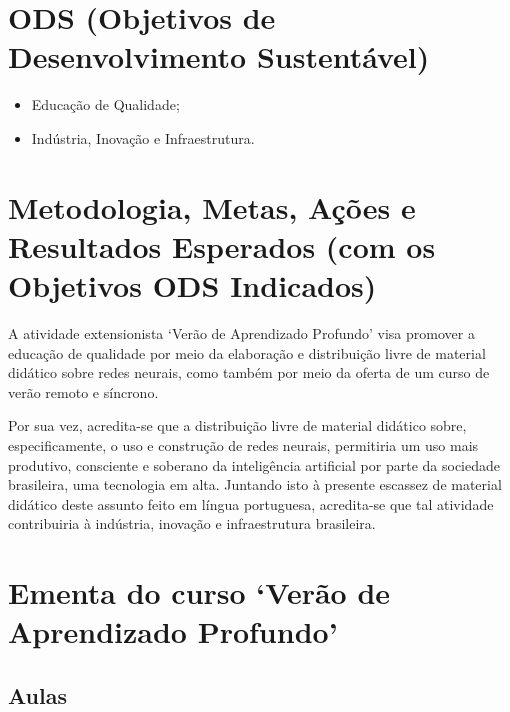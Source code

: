 \documentclass[a4paper,12pt, brazil]{article}
\begin{document}
    \section*{ODS (Objetivos de Desenvolvimento Sustentável)}
    \begin{itemize}
        \item Educação de Qualidade;
        \item Indústria, Inovação e Infraestrutura.
    \end{itemize}

    \section*{Metodologia, Metas, Ações e Resultados Esperados (com os Objetivos ODS Indicados)}
    A atividade extensionista `Verão de Aprendizado Profundo' visa promover a educação de qualidade por meio da elaboração e distribuição livre de material didático sobre redes neurais, como também por meio da oferta de um curso de verão remoto e síncrono.

    Por sua vez, acredita-se que a distribuição livre de material didático sobre, especificamente, o uso e construção de redes neurais, permitiria um uso mais produtivo, consciente e soberano da inteligência artificial por parte da sociedade brasileira, uma tecnologia em alta. Juntando isto à presente escassez de material didático deste assunto feito em língua portuguesa, acredita-se que tal atividade contribuiria à indústria, inovação e infraestrutura brasileira.

    \section*{Ementa do curso `Verão de Aprendizado Profundo'}
    
    \subsection*{Aulas}
\end{document}
